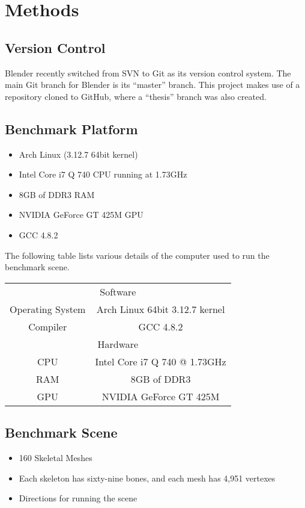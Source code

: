 \section{Methods}

\subsection{Version Control}
Blender recently switched from SVN\cite{svn} to Git\cite{git} as its version control system\cite{blendergit}.
The main Git branch for Blender is its ``master'' branch.
This project makes use of a repository cloned to GitHub\cite{github}, where a ``thesis'' branch was also created.

\subsection{Benchmark Platform}
\label{sec:bench_platform}
\ifsummaries
\begin{itemize}
 \item Arch Linux (3.12.7 64bit kernel)
 \item Intel Core i7 Q 740 CPU running at 1.73GHz
 \item 8GB of DDR3 RAM
 \item NVIDIA GeForce GT 425M GPU
 \item GCC 4.8.2
\end{itemize}
\fi

The following table lists various details of the computer used to run the benchmark scene.

\smallskip

\begin{center}
\begin{tabular}{cc}
 \hline
 \multicolumn{2}{c}{\cellcolor[gray]{0.8}Software} \\
 Operating System & Arch Linux 64bit 3.12.7 kernel \\
 Compiler & GCC 4.8.2 \\
 \multicolumn{2}{c}{\cellcolor[gray]{0.8}Hardware} \\
 CPU & Intel Core i7 Q 740 @ 1.73GHz \\
 RAM & 8GB of DDR3 \\
 GPU & NVIDIA GeForce GT 425M \\
 \hline
\end{tabular}
\end{center}

\subsection{Benchmark Scene}
\label{sec:bench_scene}
\ifsummaries
\begin{itemize}
 \item 160 Skeletal Meshes
 \item Each skeleton has sixty-nine bones, and each mesh has 4,951 vertexes
 \item Directions for running the scene
\end{itemize}
\fi

